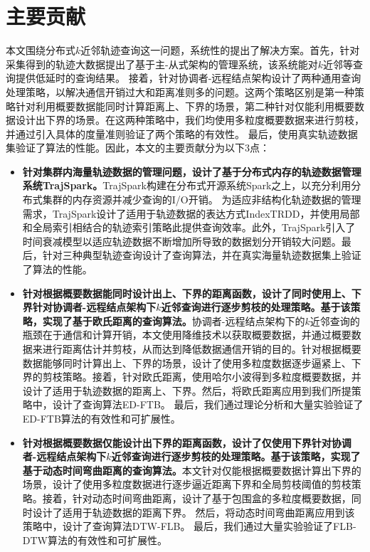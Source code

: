 \section{主要贡献}\label{sec-c1-contribution}
本文围绕分布式$k$近邻轨迹查询这一问题，系统性的提出了解决方案。首先，针对采集得到的轨迹大数据提出了基于主-从式架构的管理系统，该系统能对$k$近邻等查询提供低延时的查询结果。
接着，针对协调者-远程结点架构设计了两种通用查询处理策略，以解决通信开销过大和距离准则多的问题。这两个策略区别是第一种策略针对利用概要数据能同时计算距离上、下界的场景，第二种针对仅能利用概要数据设计出下界的场景。在这两种策略中，我们均使用多粒度概要数据来进行剪枝，并通过引入具体的度量准则验证了两个策略的有效性。
最后，使用真实轨迹数据集验证了算法的性能。因此，本文的主要贡献分为以下3点：
\begin{itemize}
	\item  \textbf{针对集群内海量轨迹数据的管理问题，设计了基于分布式内存的轨迹数据管理系统TrajSpark。}TrajSpark构建在分布式开源系统Spark之上，以充分利用分布式集群的内存资源并减少查询的I/O开销。
	为适应非结构化轨迹数据的管理需求，TrajSpark设计了适用于轨迹数据的表达方式IndexTRDD，并使用局部和全局索引相结合的轨迹索引策略此提供查询效率。此外，TrajSpark引入了时间衰减模型以适应轨迹数据不断增加所导致的数据划分开销较大问题。最后，针对三种典型轨迹查询设计了查询算法，并在真实海量轨迹数据集上验证了算法的性能。
	
	\item  \textbf{针对根据概要数据能同时设计出上、下界的距离函数，设计了同时使用上、下界针对协调者-远程结点架构下$k$近邻查询进行逐步剪枝的处理策略。基于该策略，实现了基于欧氏距离的查询算法。}协调者-远程结点架构下的$k$近邻查询的瓶颈在于通信和计算开销，本文使用降维技术以获取概要数据，并通过概要数据来进行距离估计并剪枝，从而达到降低数据通信开销的目的。针对根据概要数据能够同时计算出上、下界的场景，设计了使用多粒度数据逐步逼紧上、下界的剪枝策略。接着，针对欧氏距离，使用哈尔小波得到多粒度概要数据，并设计了适用于轨迹数据的距离上、下界。然后，将欧氏距离应用到我们所提策略中，设计了查询算法ED-FTB。
	最后，我们通过理论分析和大量实验验证了ED-FTB算法的有效性和可扩展性。
	
		\item  \textbf{针对根据概要数据仅能设计出下界的距离函数，设计了仅使用下界针对协调者-远程结点架构下$k$近邻查询进行逐步剪枝的处理策略。基于该策略，实现了基于动态时间弯曲距离的查询算法。}本文针对仅能根据概要数据计算出下界的场景，设计了使用多粒度数据进行逐步逼近距离下界和全局剪枝阈值的剪枝策略。接着，针对动态时间弯曲距离，设计了基于包围盒的多粒度概要数据，同时设计了适用于轨迹数据的距离下界。
		然后，将动态时间弯曲距离应用到该策略中，设计了查询算法DTW-FLB。
最后，我们通过大量实验验证了FLB-DTW算法的有效性和可扩展性。
	

\end{itemize}
